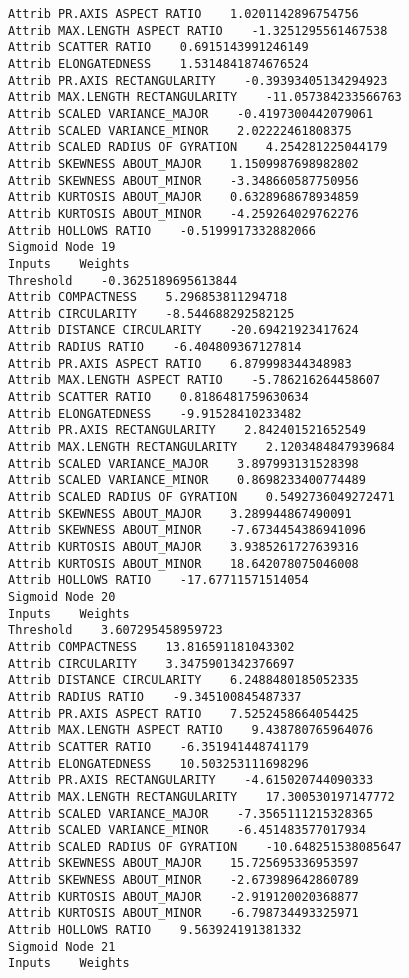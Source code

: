 \documentclass[
	article,			%
	11pt,				%
	oneside,			%
	a4paper,			%
	english,			%
	brazil,				%
	sumario=tradicional
	]{abntex2}
\begin{document}
\begin{lstlisting}
Attrib PR.AXIS ASPECT RATIO    1.0201142896754756
Attrib MAX.LENGTH ASPECT RATIO    -1.3251295561467538
Attrib SCATTER RATIO    0.6915143991246149
Attrib ELONGATEDNESS    1.5314841874676524
Attrib PR.AXIS RECTANGULARITY    -0.39393405134294923
Attrib MAX.LENGTH RECTANGULARITY    -11.057384233566763
Attrib SCALED VARIANCE_MAJOR    -0.4197300442079061
Attrib SCALED VARIANCE_MINOR    2.02222461808375
Attrib SCALED RADIUS OF GYRATION    4.254281225044179
Attrib SKEWNESS ABOUT_MAJOR    1.1509987698982802
Attrib SKEWNESS ABOUT_MINOR    -3.348660587750956
Attrib KURTOSIS ABOUT_MAJOR    0.6328968678934859
Attrib KURTOSIS ABOUT_MINOR    -4.259264029762276
Attrib HOLLOWS RATIO    -0.5199917332882066
Sigmoid Node 19
Inputs    Weights
Threshold    -0.3625189695613844
Attrib COMPACTNESS    5.296853811294718
Attrib CIRCULARITY    -8.544688292582125
Attrib DISTANCE CIRCULARITY    -20.69421923417624
Attrib RADIUS RATIO    -6.404809367127814
Attrib PR.AXIS ASPECT RATIO    6.879998344348983
Attrib MAX.LENGTH ASPECT RATIO    -5.786216264458607
Attrib SCATTER RATIO    0.8186481759630634
Attrib ELONGATEDNESS    -9.91528410233482
Attrib PR.AXIS RECTANGULARITY    2.842401521652549
Attrib MAX.LENGTH RECTANGULARITY    2.1203484847939684
Attrib SCALED VARIANCE_MAJOR    3.897993131528398
Attrib SCALED VARIANCE_MINOR    0.8698233400774489
Attrib SCALED RADIUS OF GYRATION    0.5492736049272471
Attrib SKEWNESS ABOUT_MAJOR    3.289944867490091
Attrib SKEWNESS ABOUT_MINOR    -7.6734454386941096
Attrib KURTOSIS ABOUT_MAJOR    3.9385261727639316
Attrib KURTOSIS ABOUT_MINOR    18.642078075046008
Attrib HOLLOWS RATIO    -17.67711571514054
Sigmoid Node 20
Inputs    Weights
Threshold    3.607295458959723
Attrib COMPACTNESS    13.816591181043302
Attrib CIRCULARITY    3.3475901342376697
Attrib DISTANCE CIRCULARITY    6.2488480185052335
Attrib RADIUS RATIO    -9.345100845487337
Attrib PR.AXIS ASPECT RATIO    7.5252458664054425
Attrib MAX.LENGTH ASPECT RATIO    9.438780765964076
Attrib SCATTER RATIO    -6.351941448741179
Attrib ELONGATEDNESS    10.503253111698296
Attrib PR.AXIS RECTANGULARITY    -4.615020744090333
Attrib MAX.LENGTH RECTANGULARITY    17.300530197147772
Attrib SCALED VARIANCE_MAJOR    -7.3565111215328365
Attrib SCALED VARIANCE_MINOR    -6.451483577017934
Attrib SCALED RADIUS OF GYRATION    -10.648251538085647
Attrib SKEWNESS ABOUT_MAJOR    15.725695336953597
Attrib SKEWNESS ABOUT_MINOR    -2.673989642860789
Attrib KURTOSIS ABOUT_MAJOR    -2.919120020368877
Attrib KURTOSIS ABOUT_MINOR    -6.798734493325971
Attrib HOLLOWS RATIO    9.563924191381332
Sigmoid Node 21
Inputs    Weights

\end{lstlisting}
\end{document}
